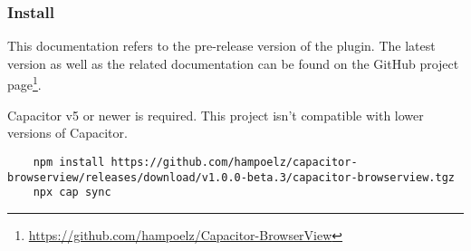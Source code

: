 \subsubsection{Install}
\label{sec:Capacitor-BrowserView:Install}

This documentation refers to the pre-release version  of the plugin.
The latest version as well as the related documentation can be found on the GitHub project page\footnote{\url{https://github.com/hampoelz/Capacitor-BrowserView}}.

Capacitor v5 or newer is required. This project isn't compatible with lower versions of Capacitor.

\begin{verbatim}
    npm install https://github.com/hampoelz/capacitor-browserview/releases/download/v1.0.0-beta.3/capacitor-browserview.tgz
    npx cap sync
\end{verbatim}
